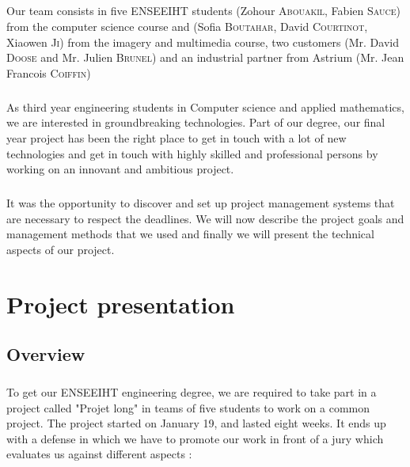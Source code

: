 \documentclass{report}
\begin{document}
\paragraph{}
\hspace{4mm}Our team consists
 in five ENSEEIHT students (Zohour \textsc{Abouakil}, Fabien \textsc{Sauce})
from the computer science course and (Sofia \textsc{Boutahar}, David \textsc{Courtinot},
Xiaowen \textsc{Ji}) from the imagery and multimedia course, two customers (Mr. David \textsc{Doose} and Mr. Julien \textsc{Brunel})
and an industrial partner from Astrium (Mr. Jean Francois \textsc{Coiffin})

\paragraph{}
\hspace{4mm}As third year engineering students in Computer science and applied mathematics, we are interested in groundbreaking technologies. Part of our degree, our final year project has been the right place
 to get in touch with a lot of new technologies and get in touch with 
highly skilled and professional persons by working on an
  innovant and ambitious project.

\paragraph{}
\hspace{4mm}It was the opportunity to discover and set up
 project management systems that are necessary to respect the deadlines. We will now describe the project goals and management methods 
that we used and finally we will present the technical aspects of our project.

\chapter{Project presentation}

\section{Overview}

\paragraph{}
\hspace{4mm}To get our ENSEEIHT engineering degree, we are required to 
take part in a project called "Projet long" in teams of five students 
to work on a common project. The project started on January 19, 
and lasted eight weeks. It ends up with a defense in which we have to
 promote our work in front of a jury which evaluates us against 
different aspects :
\end{document}
